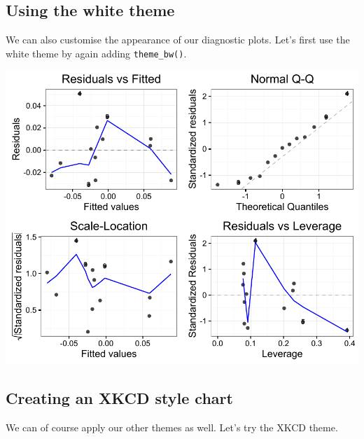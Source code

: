 \subsection{Using the white theme}\label{using-the-white-theme-1}

We can also customise the appearance of our diagnostic plots. Let's
first use the white theme by again adding \texttt{theme\_bw()}.

\begin{Shaded}
\begin{Highlighting}[]
 \NormalTok{) +}\StringTok{ }\NormalTok{()}
\end{Highlighting}
\end{Shaded}

\begin{center}\includegraphics[width=0.6\linewidth]{11_Linear_Regression_Plot_pdf/lr_20-1} \end{center}

\subsection{Creating an XKCD style
chart}\label{creating-an-xkcd-style-chart-1}

We can of course apply our other themes as well. Let's try the XKCD
theme.

